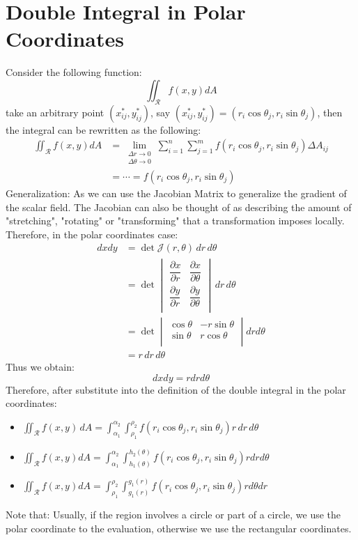 \documentclass[UTF8,a4paper, 10pt, openany]{book}
\begin{document}
\section{Double Integral in Polar Coordinates}
Consider the following function:
$$\iint_{\mathcal{R}}f(x,y)dA$$
take an arbitrary point $(x_{ij}^*,y_{ij}^*)$, say $(x_{ij}^*,y_{ij}^*)=(r_{i}\cos \theta_{j},r_{i}\sin \theta_{j})$, then the integral can be rewritten as the following:
\begin{align*}
\iint_{\mathcal{R}}f(x,y)dA &= \lim_{\substack{\Delta r\to 0\\ \Delta \theta\to 0}}\displaystyle\sum_{i=1}^{n}\displaystyle\sum_{j=1}^{m}f(r_{i}\cos \theta_{j},r_{i}\sin \theta_{j})\Delta A_{ij}\\
&=\cdots =f(r_{i}\cos \theta_{j},r_{i}\sin \theta_{j})
\end{align*}
Generalization:
As we can use the Jacobian Matrix to generalize the gradient of the scalar field. The Jacobian can also be thought of as describing the amount of "stretching", "rotating" or "transforming" that a transformation imposes locally. \\
Therefore, in the polar coordinates case:
\begin{align*}
dxdy & =\det\mathcal{J}(r,\theta)\,dr \,d\theta\\
&=\det
\begin{vmatrix}
\dfrac{\partial x}{\partial r} & \dfrac{\partial x}{\partial \theta} \\
\dfrac{\partial y}{\partial r} & \dfrac{\partial y}{\partial \theta} \\
\end{vmatrix} \,dr \,d\theta\\
&=\det
\begin{vmatrix}
\cos \theta & -r\sin \theta \\
\sin \theta & r\cos \theta \\
\end{vmatrix}drd\theta\\
&=r \,dr \,d\theta
\end{align*}
Thus we obtain:
$$dxdy=rdrd\theta$$
Therefore, after substitute into the definition of the double integral in the polar coordinates:
\begin{itemize}
\item $\displaystyle\iint_{\mathcal{R}}f(x,y)\,dA=\int_{\alpha_{1}}^{\alpha_{2}}\int_{\rho_{1}}^{\rho_{2}}f(r_{i}\cos \theta_{j},r_{i}\sin \theta_{j})r \,dr \,d\theta$
\item $\displaystyle\iint_{\mathcal{R}}f(x,y)dA=\int_{\alpha_{1}}^{\alpha_{2}}\int_{h_{1}(\theta)}^{h_{2}(\theta)}f(r_{i}\cos \theta_{j},r_{i}\sin \theta_{j})rdrd\theta$
\item $\displaystyle\iint_{\mathcal{R}}f(x,y)dA=\int_{\rho_{1}}^{\rho_{2}}\int_{g_{1}(r)}^{g_{1}(r)}f(r_{i}\cos \theta_{j},r_{i}\sin \theta_{j})rd\theta dr$
\end{itemize}
Note that: Usually, if the region involves a circle or part of a circle, we use the polar coordinate to the evaluation, otherwise we use the rectangular coordinates.
\end{document}
